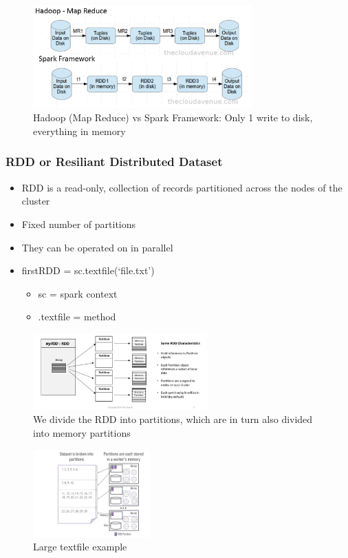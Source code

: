 \documentclass{article}
\begin{document}
\begin{figure}[H]
    \centering
    \includegraphics[width=0.75\textwidth]{spark2.png}
    \caption{Hadoop (Map Reduce) vs Spark Framework: Only 1 write to disk, everything in memory}
\end{figure}

\subsubsection{RDD or Resiliant Distributed Dataset}

\begin{itemize}
    \item RDD is a read-only, collection of records partitioned across the nodes of the cluster
    \item Fixed number of partitions
    \item They can be operated on in parallel
    \item firstRDD = sc.textfile(`file.txt')
    \begin{itemize}
        \item sc = spark context
        \item .textfile = method
    \end{itemize}
\end{itemize}

\begin{figure}[H]
    \centering
    \includegraphics[width=0.6\textwidth]{rdd2.png}
    \caption{We divide the RDD into partitions, which are in turn also divided into memory partitions}
\end{figure}


\begin{figure}[H]
    \centering
    \includegraphics[width=0.4\textwidth]{rdd.png}
    \caption{Large textfile example}
\end{figure}
\end{document}
